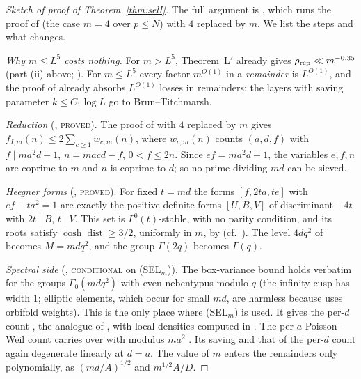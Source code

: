 \documentclass[10pt,reqno]{amsart}
\theoremstyle{definition}
\newcommand{\status}[1]{\textup{\textsc{#1}}}
\begin{document}
\begin{proof}[Sketch of proof of Theorem~\ref{thm:selI}]
The full argument is \cite[\S\S1--4]{MN4}, which runs the proof of
\cite[Thm.~8.2]{HN} (the case $m=4$ over $p\leq N$) with $4$ replaced by
$m$.  We list the steps and what changes.

\emph{Why $m\leq L^5$ costs nothing.}  For $m>L^5$, Theorem~L$'$ already
gives $\rho_{\rm rep}\ll m^{-0.35}$ (part (ii) above; \cite[Lemma~0.1]{MN4}).  For
$m\leq L^5$ every factor $m^{O(1)}$ in a \emph{remainder} is $L^{O(1)}$, and
the proof of \cite[Thm.~8.2]{HN} already absorbs $L^{O(1)}$ losses in
remainders: the layers with saving parameter $k\leq C_1\log L$ go to
Brun--Titchmarsh.

\emph{Reduction} (\cite[Lemma~1.1]{MN4}, \status{proved}).  The proof of
\cite[Prop.~2.2]{ET} with $4$ replaced by $m$ gives
$f_{I,m}(n)\leq2\sum_{c\geq1}w_{c,m}(n)$, where $w_{c,m}(n)$ counts
$(a,d,f)$ with $f\mid ma^2d+1$, $n=macd-f$, $0<f\leq2n$.  Since
$ef=ma^2d+1$, the variables $e,f,n$ are coprime to $m$ and $n$ is coprime
to $d$; so no prime dividing $md$ can be sieved.

\emph{Heegner forms} (\cite[\S2.1]{MN4}, \status{proved}).  For fixed
$t=md$ the forms $[f,2ta,te]$ with $ef-ta^2=1$ are exactly the positive
definite forms $[U,B,V]$ of discriminant $-4t$ with $2t\mid B$, $t\mid V$.
This set is $\Gamma^0(t)$-stable, with no parity condition, and its
roots satisfy $\cosh\operatorname{dist}\geq3/2$, uniformly in $m$, by
\cite[Lemma~2.2$_m$]{MN4} (cf.\ \cite[Lemma~3.2]{HN}).  The level $4dq^2$ of \cite{HN} becomes %
$M=mdq^2$, and the group $\Gamma(2q)$ becomes $\Gamma(q)$.

\emph{Spectral side} (\cite[\S2.2]{MN4}, \status{conditional} on (SEL$_m$)).
The box-variance bound \cite[Prop.~5.1]{HN} holds verbatim for the groups
$\Gamma_0(mdq^2)$ with even nebentypus modulo $q$ (the infinity cusp has
width $1$; elliptic elements, which occur for small $md$, are harmless
because \cite{HN} uses orbifold weights).  This is the only place where
(SEL$_m$) is used.  It gives the per-$d$ count
\cite[Thm.~6.2$_m$]{MN4}, the analogue of \cite[Thm.~6.2]{HN}, with local
densities computed in \cite[Lemma~6.1$_m$]{MN4}.  The per-$a$
Poisson--Weil count \cite[Prop.~7.1]{HN} carries over with modulus $ma^2$
\cite[\S2.6]{MN4}.  Its saving and that of the per-$d$ count again
degenerate linearly at $d=a$.  The value of $m$ enters the remainders only
polynomially, as $(md/A)^{1/2}$ and $m^{1/2}A/D$.


\end{proof}
\end{document}
